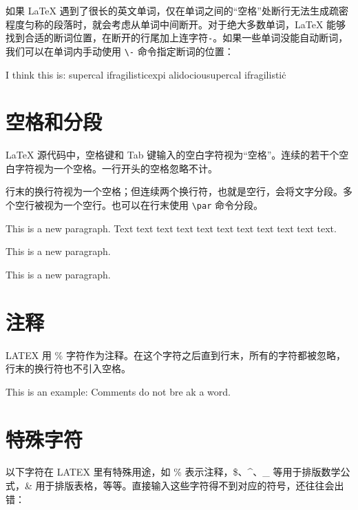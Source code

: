 如果 \LaTeX{} 遇到了很长的英文单词，仅在单词之间的“空格”处断行无法生成疏密程度匀称的段落时，就会考虑从单词中间断开。对于绝大多数单词，\LaTeX{} 能够找到合适的断词位置，在断开的行尾加上连字符\lstinline{-}。如果一些单词没能自动断词，我们可以在单词内手动使用 \lstinline{\-} 命令指定断词的位置：

\begin{codeshow}
  I think this is: su\-per\-cal\-%
  i\-frag\-i\-lis\-tic\-ex\-pi\-%
  al\-i\-do\-ciousu\-per\-cal\-%
  i\-frag\-i\-lis\-tic\.
\end{codeshow}

\section{空格和分段}\label{sec:space}
\LaTeX{} 源代码中，空格键和 Tab 键输入的空白字符视为“空格”。连续的若干个空白字符视为一个空格。一行开头的空格忽略不计。

行末的换行符视为一个空格；但连续两个换行符，也就是空行，会将文字分段。多个空行被视为一个空行。也可以在行末使用 \lstinline{\par} 命令分段。

\begin{codeshow}
  This is a new paragraph. Text text text
  text text   text text text text text text.

  This is a new paragraph.\par
  This is a new paragraph.
\end{codeshow}

\section{注释}\label{sec:comment}
LATEX 用 \% 字符作为注释。在这个字符之后直到行末，所有的字符都被忽略，行末的换行符也不引入空格。

\begin{codeshow}
  This is an %
  example: Comments do not bre%
  ak a word.
\end{codeshow}

\section{特殊字符}\label{sec:special}

以下字符在 LATEX 里有特殊用途，如 \% 表示注释，\$、\^{}、\_ 等用于排版数学公式，\& 用于排版表格，等等。直接输入这些字符得不到对应的符号，还往往会出错：

